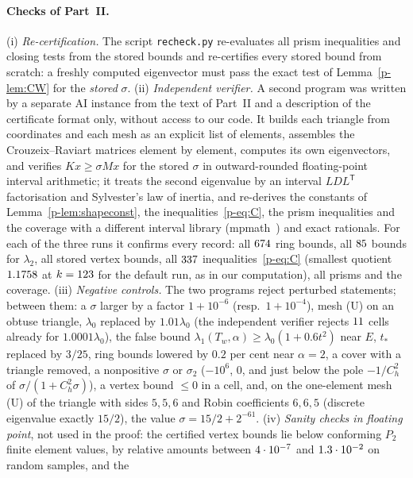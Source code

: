 \documentclass[11pt]{article}
\theoremstyle{remark}
\begin{document}
\paragraph{Checks of Part~II.} (i) \emph{Re-certification.} The script \texttt{recheck.py}
re-evaluates all prism inequalities and closing tests from the stored bounds and re-certifies every
stored bound from scratch: a freshly computed eigenvector must pass the exact test of
Lemma~\ref{p-lem:CW} for the \emph{stored} $\sigma$. (ii) \emph{Independent verifier.} A second program
was written by a separate AI instance from the text of Part~II and a description of the certificate
format only, without access to our code. It builds each triangle from coordinates and each mesh as an
explicit list of elements, assembles the Crouzeix--Raviart matrices element by element, computes its own
eigenvectors, and verifies $Kx\ge\sigma Mx$ for the stored $\sigma$ in outward-rounded floating-point
interval arithmetic; it treats the second eigenvalue by an interval $LDL^{\mathsf T}$ factorisation and
Sylvester's law of inertia, and re-derives the constants of Lemma~\ref{p-lem:shapeconst}, the
inequalities~\eqref{p-eq:C}, the prism inequalities and the coverage with a different interval library
(mpmath~\cite{mpmath}) and exact rationals. For each of the three runs it confirms every record: all
$674$ ring bounds, all $85$ bounds for $\lambda_2$, all stored vertex bounds, all
$337$ inequalities~\eqref{p-eq:C} (smallest quotient $1.1758$ at $k=123$ for the default
run, as in our computation), all prisms and the coverage. (iii) \emph{Negative controls.} The two programs
reject perturbed statements; between them: a $\sigma$ larger by a factor $1+10^{-6}$ (resp.\
$1+10^{-4}$), mesh (U) on an obtuse triangle, $\lambda_0$ replaced by $1.01\lambda_0$ (the independent verifier rejects
$11$ cells already for $1.0001\lambda_0$), the false bound
$\lambda_1(T_w,\alpha)\ge\lambda_0(1+0.6t^2)$ near $E$, $t_*$ replaced by $3/25$, ring bounds lowered by
$0.2$ per cent near $\alpha=2$, a cover with a triangle removed, a nonpositive $\sigma$ or $\sigma_2$
($-10^6$, $0$, and just below the pole $-1/C_h^2$ of $\sigma/(1+C_h^2\sigma)$), a vertex bound
$\le0$ in a cell, and, on the one-element mesh (U) of the triangle with sides $5,5,6$ and Robin
coefficients $6,6,5$ (discrete eigenvalue exactly $15/2$), the value $\sigma=15/2+2^{-61}$. (iv) \emph{Sanity checks in
floating point}, not used in the proof: the certified vertex bounds lie below conforming $P_2$ finite
element values, by relative amounts between $4\cdot10^{-7}$ and $1.3\cdot10^{-2}$ on random samples, and the
\end{document}
